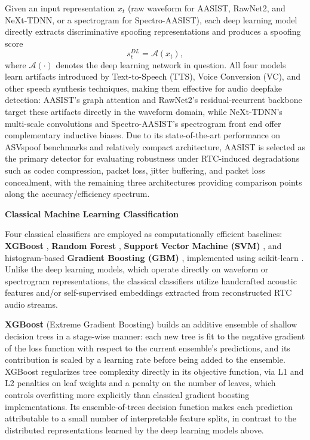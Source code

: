 Given an input representation $x_t$ (raw waveform for AASIST, RawNet2, and NeXt-TDNN, or a spectrogram for Spectro-AASIST), each deep learning model directly extracts discriminative spoofing representations and produces a spoofing score
\begin{equation}
s_t^{DL} = \mathcal{A}(x_t),
\end{equation}
where $\mathcal{A}(\cdot)$ denotes the deep learning network in question. All four models learn artifacts introduced by Text-to-Speech (TTS), Voice Conversion (VC), and other speech synthesis techniques, making them effective for audio deepfake detection: AASIST's graph attention and RawNet2's residual-recurrent backbone target these artifacts directly in the waveform domain, while NeXt-TDNN's multi-scale convolutions and Spectro-AASIST's spectrogram front end offer complementary inductive biases. Due to its state-of-the-art performance on ASVspoof benchmarks and relatively compact architecture, AASIST is selected as the primary detector for evaluating robustness under RTC-induced degradations such as codec compression, packet loss, jitter buffering, and packet loss concealment, with the remaining three architectures providing comparison points along the accuracy/efficiency spectrum.

\textbf{Classical Machine Learning Classification}

Four classical classifiers are employed as computationally efficient baselines: \textbf{XGBoost} \cite{Chen2016_xgboost}, \textbf{Random Forest} \cite{Breiman2001_rf}, \textbf{Support Vector Machine (SVM)} \cite{Cortes1995_svm}, and histogram-based \textbf{Gradient Boosting (GBM)} \cite{Ke2017_lightgbm, Friedman2001_gb}, implemented using scikit-learn \cite{Pedregosa2011_sklearn}. Unlike the deep learning models, which operate directly on waveform or spectrogram representations, the classical classifiers utilize handcrafted acoustic features and/or self-supervised embeddings extracted from reconstructed RTC audio streams.

\textbf{XGBoost} \cite{Chen2016_xgboost} (Extreme Gradient Boosting) builds an additive ensemble of shallow decision trees in a stage-wise manner: each new tree is fit to the negative gradient of the loss function with respect to the current ensemble's predictions, and its contribution is scaled by a learning rate before being added to the ensemble. XGBoost regularizes tree complexity directly in its objective function, via L1 and L2 penalties on leaf weights and a penalty on the number of leaves, which controls overfitting more explicitly than classical gradient boosting implementations. Its ensemble-of-trees decision function makes each prediction attributable to a small number of interpretable feature splits, in contrast to the distributed representations learned by the deep learning models above.

